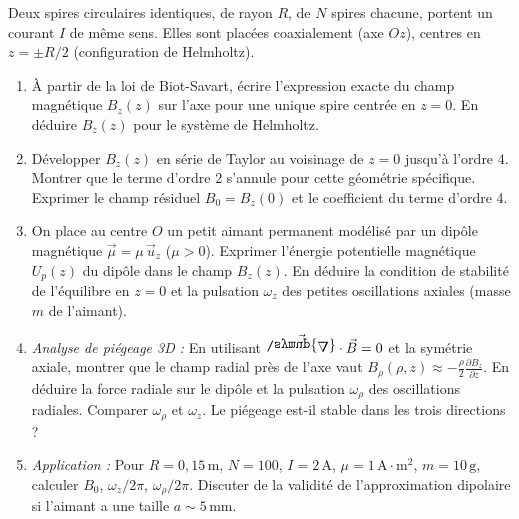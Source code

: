 \documentclass[11pt]{article}
\def\nabla{\mathord{\raisebox{\depth}{\scalebox{1}[-1]{$\symup{\Delta}$}}}}%
\begin{document}
\begin{exercice}
Deux spires circulaires identiques, de rayon $R$, de $N$ spires chacune, portent un courant $I$ de même sens. Elles sont placées coaxialement (axe $Oz$), centres en $z = \pm R/2$ (configuration de Helmholtz).
\begin{enumerate}
    \item À partir de la loi de Biot-Savart, écrire l'expression exacte du champ magnétique $B_z(z)$ sur l'axe pour une unique spire centrée en $z=0$. En déduire $B_z(z)$ pour le système de Helmholtz.
    \item Développer $B_z(z)$ en série de Taylor au voisinage de $z=0$ jusqu'à l'ordre 4. Montrer que le terme d'ordre 2 s'annule pour cette géométrie spécifique. Exprimer le champ résiduel $B_0 = B_z(0)$ et le coefficient du terme d'ordre 4.
    \item On place au centre $O$ un petit aimant permanent modélisé par un dipôle magnétique $\vec{\mu} = \mu\,\vec{u}_z$ ($\mu>0$). Exprimer l'énergie potentielle magnétique $U_p(z)$ du dipôle dans le champ $B_z(z)$. En déduire la condition de stabilité de l'équilibre en $z=0$ et la pulsation $\omega_z$ des petites oscillations axiales (masse $m$ de l'aimant).
    \item \textit{Analyse de piégeage 3D :} En utilisant $\vec{\nabla} \cdot \vec{B} = 0$ et la symétrie axiale, montrer que le champ radial près de l'axe vaut $B_\rho(\rho, z) \approx -\frac{\rho}{2} \frac{\partial B_z}{\partial z}$. En déduire la force radiale sur le dipôle et la pulsation $\omega_\rho$ des oscillations radiales. Comparer $\omega_\rho$ et $\omega_z$. Le piégeage est-il stable dans les trois directions ?
    \item \textit{Application :} Pour $R=0,15\,\text{m}$, $N=100$, $I=2\,\text{A}$, $\mu = 1\,\text{A}\cdot\text{m}^2$, $m=10\,\text{g}$, calculer $B_0$, $\omega_z/2\pi$, $\omega_\rho/2\pi$. Discuter de la validité de l'approximation dipolaire si l'aimant a une taille $a \sim 5\,\text{mm}$.
\end{enumerate}
\end{exercice}
\end{document}
